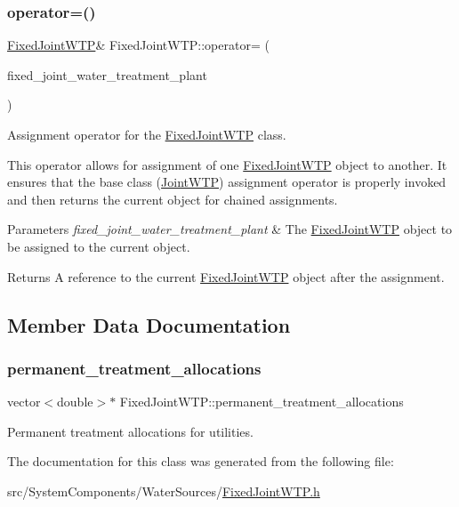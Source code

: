 \subsubsection{\texorpdfstring{operator=()}{operator=()}}
{\footnotesize\ttfamily \mbox{\hyperlink{classFixedJointWTP}{Fixed\+Joint\+W\+TP}}\& Fixed\+Joint\+W\+T\+P\+::operator= (\begin{DoxyParamCaption}\item[{const \mbox{\hyperlink{classFixedJointWTP}{Fixed\+Joint\+W\+TP}} \&}]{fixed\+\_\+joint\+\_\+water\+\_\+treatment\+\_\+plant }\end{DoxyParamCaption})}



Assignment operator for the \mbox{\hyperlink{classFixedJointWTP}{Fixed\+Joint\+W\+TP}} class. 

This operator allows for assignment of one {\ttfamily \mbox{\hyperlink{classFixedJointWTP}{Fixed\+Joint\+W\+TP}}} object to another. It ensures that the base class ({\ttfamily \mbox{\hyperlink{classJointWTP}{Joint\+W\+TP}}}) assignment operator is properly invoked and then returns the current object for chained assignments.


\begin{DoxyParams}{Parameters}
{\em fixed\+\_\+joint\+\_\+water\+\_\+treatment\+\_\+plant} & The {\ttfamily \mbox{\hyperlink{classFixedJointWTP}{Fixed\+Joint\+W\+TP}}} object to be assigned to the current object.\\
\hline
\end{DoxyParams}
\begin{DoxyReturn}{Returns}
A reference to the current {\ttfamily \mbox{\hyperlink{classFixedJointWTP}{Fixed\+Joint\+W\+TP}}} object after the assignment. 
\end{DoxyReturn}


\subsection{Member Data Documentation}
\mbox{\label{classFixedJointWTP_a88a5fadeaada96195a95ab77303bd410}} 
\subsubsection{\texorpdfstring{permanent\+\_\+treatment\+\_\+allocations}{permanent\_treatment\_allocations}}
{\footnotesize\ttfamily vector$<$double$>$$\ast$ Fixed\+Joint\+W\+T\+P\+::permanent\+\_\+treatment\+\_\+allocations\hspace{0.3cm}{\ttfamily [private]}}



Permanent treatment allocations for utilities. 



The documentation for this class was generated from the following file\+:\begin{DoxyCompactItemize}
\item 
src/\+System\+Components/\+Water\+Sources/\mbox{\hyperlink{FixedJointWTP_8h}{Fixed\+Joint\+W\+T\+P.\+h}}\end{DoxyCompactItemize}
